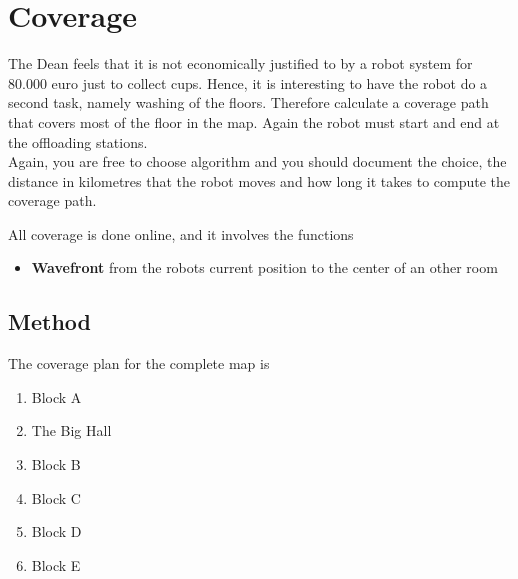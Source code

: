 \section{Coverage}
\label{sec::coverage}
The Dean feels that it is not economically justified to by a robot system for 80.000 euro just to collect cups. Hence, it is interesting to have the robot do a second task, namely washing of the floors. Therefore calculate a coverage path that covers most of the floor in the map. Again the robot must start and end at the offloading stations.\\[0.2cm]
Again, you are free to choose algorithm and you should document the choice, the distance in kilometres that the robot moves and how long it takes to compute the coverage path.

All coverage is done online, and it involves the functions
\begin{itemize}\itemsep-2pt
\item \textbf{Wavefront} from the robots current position to the center of an other room
\end{itemize}

\subsection{Method}
The coverage plan for the complete map is
\begin{enumerate}\itemsep-2pt
\item Block A
\item The Big Hall
\item Block B
\item Block C
\item Block D
\item Block E
\end{enumerate}

